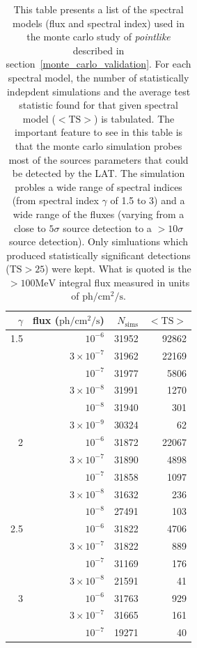 \documentclass[preprint]{aastex}
\newcommand{\mev}{\text{MeV}\xspace}
\newcommand{\s}{\text{s}\xspace}
\newcommand{\ph}{\text{ph}\xspace}
\newcommand{\cm}{\text{cm}\xspace}
\newcommand{\ts}{\text{TS}\xspace}
\newcommand{\pointlike}{{\em pointlike}\xspace}
\begin{document}
\begin{table}
  \begin{centering}
\begin{tabular}{ | r | r | r | r | }
\hline
$\gamma$ & flux ($\ph/\cm^2/\s$) & $N_\text{sims}$ & $<\ts>$ \\
\hline
  1.5 &          $10^{-6}$ &           31952 &  92862 \\
      &  $3\times 10^{-7}$ &           31962 &  22169 \\
      &          $10^{-7}$ &           31977 &   5806 \\
      &  $3\times 10^{-8}$ &           31991 &   1270 \\
      &          $10^{-8}$ &           31940 &    301 \\
      &  $3\times 10^{-9}$ &           30324 &     62 \\
\hline
    2 &          $10^{-6}$ &           31872 &  22067 \\
      &  $3\times 10^{-7}$ &           31890 &   4898 \\
      &          $10^{-7}$ &           31858 &   1097 \\
      &  $3\times 10^{-8}$ &           31632 &    236 \\
      &          $10^{-8}$ &           27491 &    103 \\
\hline
  2.5 &          $10^{-6}$ &           31822 &   4706 \\
      &  $3\times 10^{-7}$ &           31822 &    889 \\
      &          $10^{-7}$ &           31169 &    176 \\
      &  $3\times 10^{-8}$ &           21591 &     41 \\
\hline                                                
    3 &          $10^{-6}$ &           31763 &    929 \\
      &  $3\times 10^{-7}$ &           31665 &    161 \\
      &          $10^{-7}$ &           19271 &     40 \\
\hline
\end{tabular}
\caption{
This table presents a list of the spectral models (flux and spectral
index) used in the monte carlo study of \pointlike described in
section~\ref{monte_carlo_validation}.  For each spectral model, the
number of statistically indepdent simulations and the average test
statistic found for that given spectral model ($<\ts>$) is tabulated.
The important feature to see in this table is that the monte carlo
simulation probes most of the sources parameters that could be detected
by the LAT.  The simulation probles a wide range of spectral indices
(from spectral index $\gamma$ of 1.5 to 3) and a wide range of the fluxes
(varying from a close to $5\sigma$ source detection to a $>10\sigma$
source detection).  Only simluations which produced statistically
significant detections ($\ts>25$) were kept.  What is quoted is the
$>100\mev$ integral flux measured in units of $\ph/\cm^2/\s$.
}
\label{ts_ext_num_sims}
  \end{centering}
\end{table}
\end{document}
